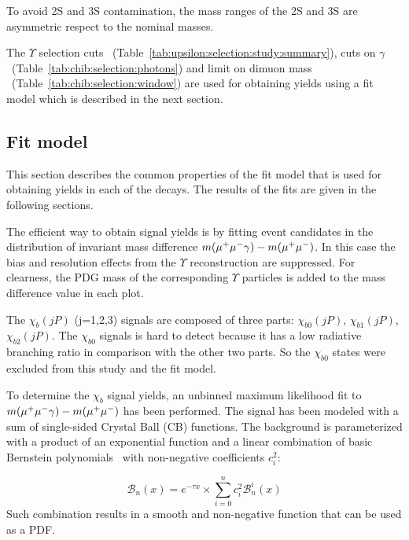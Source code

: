 

To avoid \Y2S and \Y3S contamination, the mass ranges of the \Y2S and \Y3S are
asymmetric respect to the nominal masses.

The $\Upsilon$ selection cuts
~(Table~\ref{tab:upsilon:selection:study:summary}), cuts  on $\gamma$
~(Table~\ref{tab:chib:selection:photons}) and limit on dimuon mass
~(Table~\ref{tab:chib:selection:window}) are used for obtaining \chib yields
using a fit model which is described in the next section.


\subsection{Fit model}
\label{sec:chib:fit}

This section describes the common properties of the fit model that is used for
obtaining yields in each of the \chib decays. The results of the fits are
given in the following sections.

The efficient way to obtain \chib signal yields is by fitting event candidates
in the distribution of invariant mass difference $m({\mu^+\mu^-}\gamma) - m({\mu^+\mu^-})$.
In this case the bias and resolution effects from the $\Upsilon$ reconstruction
are suppressed. For clearness, the PDG mass of the corresponding $\Upsilon$
particles is added to the mass difference value in each plot.

The $\chi_b(jP)$ (j=1,2,3) signals are composed of three parts: $\chi_{b0}(jP)$,
$\chi_{b1}(jP)$, $\chi_{b2}(jP)$. The $\chi_{b0}$ signals is hard to detect
because it has a low radiative branching ratio in comparison with the other two
parts. So the $\chi_{b0}$ states were excluded from this study and the fit
model.

To determine the $\chi_b$ signal yields, an unbinned maximum likelihood fit to
$m({\mu^+\mu^-}\gamma) - m({\mu^+\mu^-})$ has been performed. The signal has been modeled with
a sum of single-sided Crystal Ball (CB)  functions. The background is parameterized with a
product of an exponential function and a linear combination of basic Bernstein
polynomials~\cite{Phillips:2003} with non-negative coefficients $c_{i}^2$:

\begin{equation}
\label{eq:bernstein}
{\mathscr B}_{n}(x) = e^{-\tau x} \times \sum_{i=0}^{n} c_{i}^2 {\mathscr B}_{n}^{i}(x)
\end{equation}
Such combination results in a smooth and non-negative function that can be used
as a PDF.

